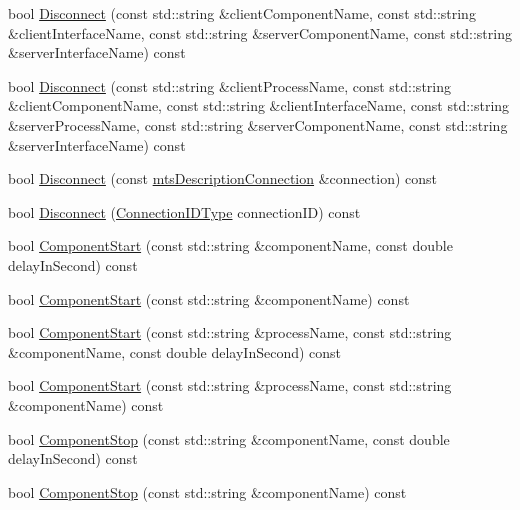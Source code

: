 \begin{DoxyCompactItemize}
\item 
bool \hyperlink{classmts_manager_component_services_af34ce4e333b67f2b93e86faae7892016}{Disconnect} (const std\+::string \&client\+Component\+Name, const std\+::string \&client\+Interface\+Name, const std\+::string \&server\+Component\+Name, const std\+::string \&server\+Interface\+Name) const 
\item 
bool \hyperlink{classmts_manager_component_services_ab3cac9ae1df0551fd62051bd8f5427d8}{Disconnect} (const std\+::string \&client\+Process\+Name, const std\+::string \&client\+Component\+Name, const std\+::string \&client\+Interface\+Name, const std\+::string \&server\+Process\+Name, const std\+::string \&server\+Component\+Name, const std\+::string \&server\+Interface\+Name) const 
\item 
bool \hyperlink{classmts_manager_component_services_add7c94f89a97fd91c5583982ff3a798e}{Disconnect} (const \hyperlink{classmts_description_connection}{mts\+Description\+Connection} \&connection) const 
\item 
bool \hyperlink{classmts_manager_component_services_a3802bce7e028c69a34111ecff65a10e5}{Disconnect} (\hyperlink{mts_forward_declarations_8h_ad3543bb11742e1766374ec96016d6547}{Connection\+I\+D\+Type} connection\+I\+D) const 
\item 
bool \hyperlink{classmts_manager_component_services_ad45767eb085ebfc86cb592fc9023f957}{Component\+Start} (const std\+::string \&component\+Name, const double delay\+In\+Second) const 
\item 
bool \hyperlink{classmts_manager_component_services_a8bb81f817f3a1389f0bbbc4d9807f8bf}{Component\+Start} (const std\+::string \&component\+Name) const 
\item 
bool \hyperlink{classmts_manager_component_services_a4721c9a1743b1fdaf7ce8fd2df0b4de5}{Component\+Start} (const std\+::string \&process\+Name, const std\+::string \&component\+Name, const double delay\+In\+Second) const 
\item 
bool \hyperlink{classmts_manager_component_services_afb90c3acef87baf6a63b3b164bdbfaf5}{Component\+Start} (const std\+::string \&process\+Name, const std\+::string \&component\+Name) const 
\item 
bool \hyperlink{classmts_manager_component_services_a6ff15a84a392361eb15eeb5f2b1a8534}{Component\+Stop} (const std\+::string \&component\+Name, const double delay\+In\+Second) const 
\item 
bool \hyperlink{classmts_manager_component_services_a88a3a6973b09552462a6a776522bfb8f}{Component\+Stop} (const std\+::string \&component\+Name) const 

\end{DoxyCompactItemize}
